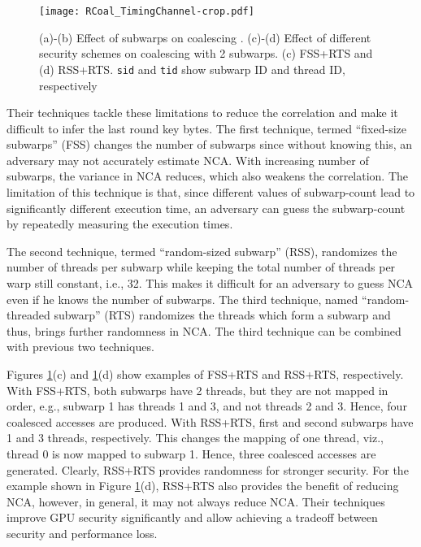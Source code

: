 \begin{figure} [htbp]
\centering
\texttt{[image: RCoal\_TimingChannel-crop.pdf]}
\caption{ (a)-(b) Effect of subwarps on  coalescing \cite{kadam2018rcoal}. (c)-(d) Effect of different security schemes on coalescing with 2 subwarps. (c) FSS+RTS and (d) RSS+RTS. {\tt sid} and {\tt tid} show subwarp ID and thread ID, respectively }\label{fig:RCoal_TimingChannel}
\end{figure}

Their techniques tackle these limitations to reduce the correlation and make it difficult to infer the last round key bytes.  The first technique, termed ``fixed-size subwarps'' (FSS) changes the number of subwarps since without knowing this, an adversary may not accurately estimate NCA. With increasing number of subwarps, the variance in NCA reduces, which also weakens the correlation. The limitation of this technique is that, since different values of subwarp-count lead to significantly different execution time, an adversary can guess the subwarp-count by repeatedly measuring the execution times.  
 

The second technique, termed ``random-sized subwarp'' (RSS),  randomizes the number of threads per subwarp while keeping the total number of threads per warp still constant, i.e., 32. This makes it difficult for an adversary to guess NCA even if he knows the number of subwarps. The third technique, named ``random-threaded subwarp'' (RTS) randomizes the threads which form a subwarp and thus, brings further randomness in NCA. The third technique can be combined with previous two techniques. 


Figures \ref{fig:RCoal_TimingChannel}(c) and \ref{fig:RCoal_TimingChannel}(d) show examples of FSS+RTS and RSS+RTS, respectively. With FSS+RTS, both subwarps have  2 threads, but they are not mapped in order, e.g., subwarp 1 has threads 1 and 3, and not threads 2 and 3. Hence, four coalesced accesses are produced. With RSS+RTS, first and second subwarps have 1 and 3 threads, respectively.   This changes the mapping of one thread, viz., thread 0 is now mapped to subwarp 1. Hence, three coalesced accesses are generated. Clearly, RSS+RTS provides randomness for stronger security. For the example shown in Figure \ref{fig:RCoal_TimingChannel}(d), RSS+RTS 
also provides the benefit of reducing NCA, however, in general, it may not always reduce NCA. Their techniques improve GPU security significantly and allow achieving a tradeoff between security and performance loss. 
    

